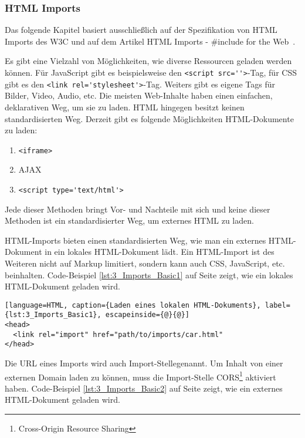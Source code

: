 \subsubsection{HTML Imports}
\label{sec:3_WC_Imports}

Das folgende Kapitel basiert ausschließlich auf der Spezifikation von HTML Imports des W3C \citereset \autocite[siehe][]{GlazkovMorrita.2013} und auf dem Artikel \glqq HTML Imports - \#include for the Web\grqq\ \citereset \autocite[siehe][]{BidelmanImports.2013}.

Es gibt eine Vielzahl von Möglichkeiten, wie diverse Ressourcen geladen werden können. Für JavaScript gibt es beispielsweise den \lstinline|<script src=''>|-Tag, für CSS gibt es den \lstinline|<link rel='stylesheet'>|-Tag. Weiters gibt es eigene Tags für Bilder, Video, Audio, etc. Die meisten Web-Inhalte haben einen einfachen, deklarativen Weg, um sie zu laden. HTML hingegen besitzt keinen standardisierten Weg. Derzeit gibt es folgende Möglichkeiten HTML-Dokumente zu laden:
\begin{enumerate}
\item \lstinline|<iframe>|
\item AJAX
\item \lstinline|<script type='text/html'>|
\end{enumerate}

Jede dieser Methoden bringt Vor- und Nachteile mit sich und keine dieser Methoden ist ein standardisierter Weg, um externes HTML zu laden.

HTML-Imports bieten einen standardisierten Weg, wie man ein externes HTML-Dokument in ein lokales HTML-Dokument lädt. Ein HTML-Import ist des Weiteren nicht auf Markup limitiert, sondern kann auch CSS, JavaScript, etc. beinhalten. Code-Beispiel \ref{lst:3_Imports_Basic1} auf Seite \pageref{lst:3_Imports_Basic1} zeigt, wie ein lokales HTML-Dokument geladen wird.

\begin{lstlisting}[language=HTML, caption={Laden eines lokalen HTML-Dokuments}, label={lst:3_Imports_Basic1}, escapeinside={@}{@}]
<head>
  <link rel="import" href="path/to/imports/car.html"
</head>
\end{lstlisting}

Die URL eines Imports wird auch \glqq Import-Stelle\grqq genannt. Um Inhalt von einer externen Domain laden zu können, muss die Import-Stelle CORS\footnote{Cross-Origin Resource Sharing} aktiviert haben. Code-Beispiel \ref{lst:3_Imports_Basic2} auf Seite \pageref{lst:3_Imports_Basic2} zeigt, wie ein externes HTML-Dokument geladen wird.

